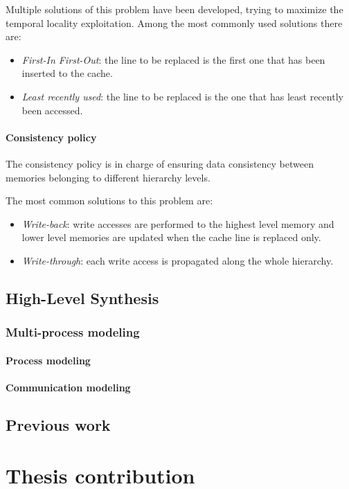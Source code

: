 \documentclass[11pt,a4paper]{memoir}
\begin{document}
Multiple solutions of this problem have been developed, trying to maximize
the temporal locality exploitation.
Among the most commonly used solutions there are:
\begin{itemize}
	\item \emph{First-In First-Out}: the line to be replaced is the first
		one that has been inserted to the cache.
	\item \emph{Least recently used}: the line to be replaced is the one
		that has least recently been accessed.
\end{itemize}

\subsubsection{Consistency policy}
The consistency policy is in charge of ensuring data consistency between memories
belonging to different hierarchy levels.

The most common solutions to this problem are:
\begin{itemize}
	\item \emph{Write-back}: write accesses are performed to the highest
		level memory and lower level memories are updated when the cache
		line is replaced only.
	\item \emph{Write-through}: each write access is propagated along the
		whole hierarchy.
\end{itemize}

\section{High-Level Synthesis}
\subsection{Multi-process modeling}
\subsubsection{Process modeling}
\subsubsection{Communication modeling}
\section{Previous work}
\chapter{Thesis contribution}
\end{document}
